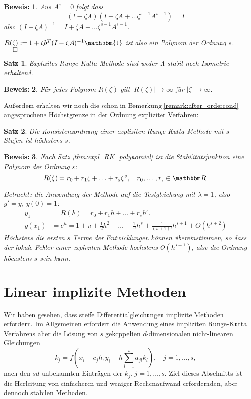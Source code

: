 \documentclass[12pt,a4paper]{book}
\theoremstyle{break}
\newtheorem{theorem}{Satz}[chapter]
\theoremstyle{nonumberplain}
\newtheorem{beweis}{Beweis:}
\newcommand{\R}{\mathbbm R}
\newcommand{\1}{\mathbbm{1}} 			      	%
\begin{document}
\begin{beweis}
Aus $A^s=0$ folgt dass
\[
(I-\zeta A) ( I+\zeta A + \ldots \zeta^{s-1} A^{s-1}) = I
\]
also $(I-\zeta A)^{-1}=I+\zeta A + \ldots \zeta^{s-1} A^{s-1}$.

$R(\zeta):=1+\zeta b^T (I-\zeta A)^{-1} \1$ ist also ein Polynom der Ordnung $s$. $\quad \Box$
\end{beweis}

\begin{theorem}
Explizites Runge-Kutta Methode sind weder A-stabil noch Isometrie-erhaltend.
\end{theorem}
\begin{beweis}
Für jedes Polynom $R(\zeta)$ gilt $|R(\zeta)|\to \infty$ für $|\zeta|\to \infty$. 
\end{beweis}

Außerdem erhalten wir noch die schon in Bemerkung \ref{remark:after_ordercond} angesprochene 
Höchstgrenze in der Ordnung expliziter Verfahren:
\begin{theorem}
Die Konsistenzordnung einer expliziten Runge-Kutta Methode mit $s$ Stufen ist höchstens $s$.
\end{theorem}
\begin{beweis}
Nach Satz \ref{thm:expl_RK_polynomial} ist die Stabilitätsfunktion eine Polynom der Ordnung $s$:
\[
R(\zeta)=r_0+r_1\zeta+\ldots+r_s \zeta^s,\quad r_0,\ldots,r_s\in \R.
\]

Betrachte die Anwendung der Methode auf die Testgleichung mit $\lambda=1$, also $y'=y$, $y(0)=1$:
\begin{align*}
y_1&=R(h)=r_0+r_1 h+\ldots+r_s h^s.\\
y(x_1)&=e^{h}=1+h+\frac{1}{2}h^2+\ldots +\frac{1}{s!} h^s + \frac{1}{(s+1)!} h^{s+1} + O(h^{s+2})
\end{align*}
Höchstens die ersten $s$ Terme der Entwicklungen können übereinstimmen, so dass der lokale Fehler einer
expliziten Methode höchstens $O(h^{s+1})$, also die Ordnung höchstens $s$ sein kann.
\end{beweis}



\section{Linear implizite Methoden}

Wir haben gesehen, dass steife Differentialgleichungen implizite Methoden erfordern. Im Allgemeinen
erfordert die Anwendung eines impliziten Runge-Kutta Verfahrens aber die Lösung
von $s$ gekoppelten $d$-dimensionalen nicht-linearen Gleichungen 
\[
k_j=f(x_i+c_j h, y_i + h \sum_{l=1}^s a_{jl} k_l), \quad j=1,\ldots,s,
\]
nach den $sd$ unbekannten Einträgen der $k_j$, $j=1,\ldots,s$. Ziel dieses Abschnitts 
ist die Herleitung von einfacheren und weniger Rechenaufwand erfordernden, aber dennoch stabilen Methoden.
\end{document}
